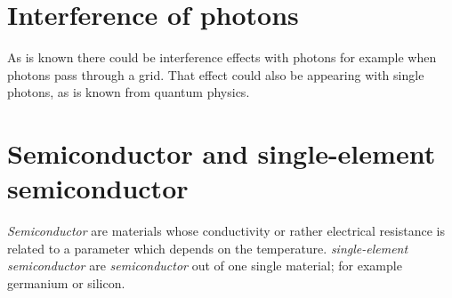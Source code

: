 \section{Interference of photons}
As is known there could be interference effects with photons for example when photons pass through a grid. That effect could also be  appearing with single photons, as is known from quantum physics.

\section{Semiconductor and single-element semiconductor}
\textit{Semiconductor} are materials whose conductivity or rather electrical resistance is related to a parameter which depends on the temperature. \textit{single-element semiconductor} are \textit{semiconductor} out of one single material; for example germanium or silicon.

